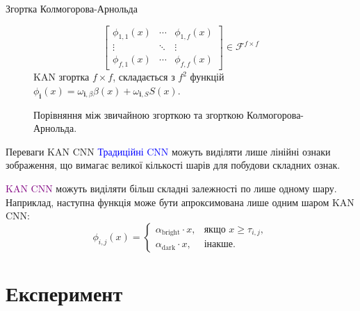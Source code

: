 \documentclass{zkdl-presentation-template}
\begin{document}
\begin{frame}[fragile]{Згортка Колмогорова-Арнольда}
\begin{figure}
\begin{minipage}{0.48\linewidth}
{\begin{equation*}
\begin{bmatrix}
                \phi_{1,1}(x) & \cdots & \phi_{1,f}(x) \\
                \vdots & \ddots & \vdots \\
                \phi_{f,1}(x) & \cdots & \phi_{f,f}(x)
            \end{bmatrix} \in \mathcal{F}^{f \times f}
            \end{equation*}
            KAN згортка $f \times f$, складається з $f^2$ функцій
            $\phi_{\boldsymbol{i}}(x)=\omega_{\boldsymbol{i},\beta}\beta(x)+\omega_{\boldsymbol{i},S} S(x)$.}
            \end{minipage}
            \caption{Порівняння між звичайною згорткою та згорткою Колмогорова-Арнольда.}
            \label{fig:kan_conv}
        \end{figure}
    \end{frame}

    \begin{frame}{Переваги KAN CNN}
        \textcolor{blue}{Традиційні CNN} можуть виділяти лише лінійні 
        ознаки зображення, що вимагає великої кількості шарів для 
        побудови складних ознак. 
        
        \textcolor{purple}{KAN CNN} можуть виділяти більш складні 
        залежності по лише одному шару. Наприклад, наступна функція 
        може бути апроксимована лише одним шаром KAN CNN:
        \begin{equation*}
            \phi_{i,j}(x) = \begin{cases}
                \alpha_{\text{bright}}\cdot x, & \text{якщо } x \geq \tau_{i,j}, \\
                \alpha_{\text{dark}}\cdot x, & \text{інакше.}
            \end{cases}
        \end{equation*}
    \end{frame}

    \section{Експеримент}
\end{document}
